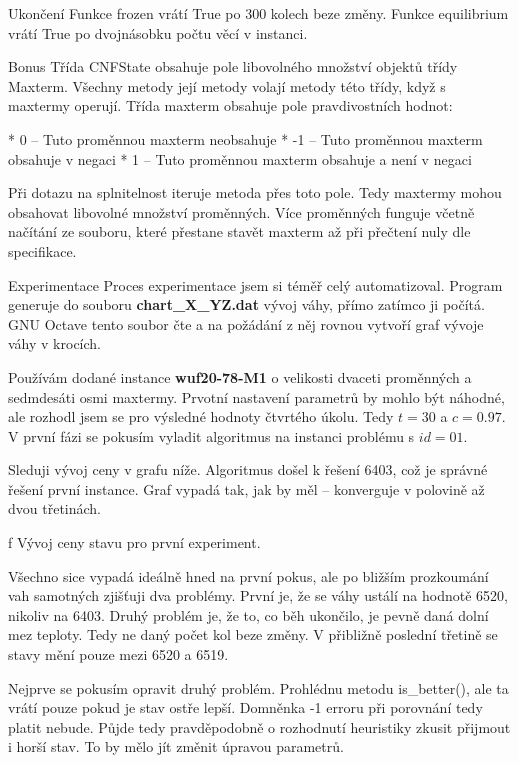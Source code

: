 \secc Ukončení
Funkce frozen vrátí True po 300 kolech beze změny. Funkce equilibrium vrátí True po dvojnásobku počtu věcí v instanci.

\secc Bonus
Třída CNFState obsahuje pole libovolného množství objektů třídy Maxterm. Všechny metody její metody volají metody této třídy, když s maxtermy operují. Třída maxterm obsahuje pole pravdivostních hodnot:

\begitems
* 0 -- Tuto proměnnou maxterm neobsahuje
* -1 -- Tuto proměnnou maxterm obsahuje v negaci
* 1 -- Tuto proměnnou maxterm obsahuje a není v negaci
\enditems

Při dotazu na splnitelnost iteruje metoda přes toto pole. Tedy maxtermy mohou obsahovat libovolné množství proměnných. Více proměnných funguje včetně načítání ze souboru, které přestane stavět maxterm až při přečtení nuly dle specifikace.

\vfill\break
\sec Experimentace
Proces experimentace jsem si téměř celý automatizoval. Program generuje do souboru {\bf chart\_X\_YZ.dat} vývoj váhy, přímo zatímco ji počítá. GNU Octave tento soubor čte a na požádání z něj rovnou vytvoří graf vývoje váhy v krocích.

Používám dodané instance {\bf wuf20-78-M1} o velikosti dvaceti proměnných a sedmdesáti osmi maxtermy. Prvotní nastavení parametrů by mohlo být náhodné, ale rozhodl jsem se pro výsledné hodnoty čtvrtého úkolu. Tedy  $t = 30$ a $c = 0.97$. V první fázi se pokusím vyladit algoritmus na instanci problému s $id=01$.

Sleduji vývoj ceny v grafu níže. Algoritmus došel k řešení 6403, což je správné řešení první instance. Graf vypadá tak, jak by měl -- konverguje v polovině až dvou třetinách.



\centerline{ \picwidth=17cm  }
\caption/f Vývoj ceny stavu pro první experiment.
\bigskip

Všechno sice vypadá ideálně hned na první pokus, ale po bližším prozkoumání vah samotných zjišťuji dva problémy. První je, že se váhy ustálí na hodnotě 6520, nikoliv na 6403. Druhý problém je, že to, co běh ukončilo, je pevně daná dolní mez teploty. Tedy ne daný počet kol beze změny. V přibližně poslední třetině se stavy mění pouze mezi 6520 a 6519.

Nejprve se pokusím opravit druhý problém. Prohlédnu metodu is\_better(), ale ta vrátí  pouze pokud je stav ostře lepší. Domněnka -1 erroru při porovnání tedy platit nebude. Půjde tedy pravděpodobně o rozhodnutí heuristiky zkusit přijmout i horší stav. To by mělo jít změnit úpravou parametrů.

